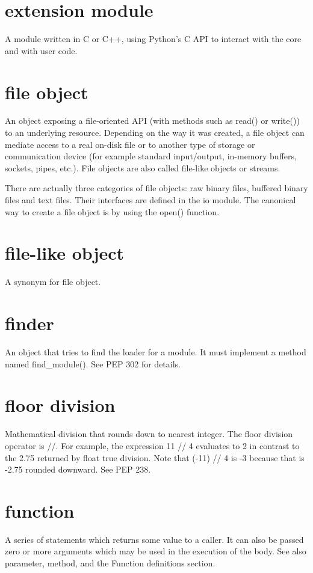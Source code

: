 \documentclass[12pt,a4paper,final,twoside,onecolumn,titlepage]{book}
\begin{document}
\section{extension module}
A module written in C or C++, using Python’s C API to interact with the core and with user code.

\section{file object}
An object exposing a file-oriented API (with methods such as read() or write()) to an underlying resource. Depending on the way it was created, a file object can mediate access to a real on-disk file or to another type of storage or communication device (for example standard input/output, in-memory buffers, sockets, pipes, etc.). File objects are also called file-like objects or streams.

There are actually three categories of file objects: raw binary files, buffered binary files and text files. Their interfaces are defined in the io module. The canonical way to create a file object is by using the open() function.

\section{file-like object}
A synonym for file object.

\section{finder}
An object that tries to find the loader for a module. It must implement a method named find\_module(). See PEP 302 for details.

\section{floor division}
Mathematical division that rounds down to nearest integer. The floor division operator is //. For example, the expression 11 // 4 evaluates to 2 in contrast to the 2.75 returned by float true division. Note that (-11) // 4 is -3 because that is -2.75 rounded downward. See PEP 238.

\section{function}
A series of statements which returns some value to a caller. It can also be passed zero or more arguments which may be used in the execution of the body. See also parameter, method, and the Function definitions section.
\end{document}
